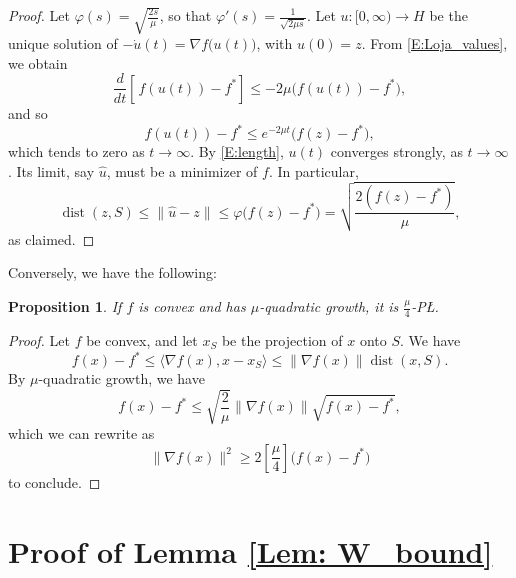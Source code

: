 \documentclass[pdflatex,sn-mathphys-num]{sn-jnl}
\theoremstyle{thmstyleone}
\newtheorem{proposition}[theorem]{Proposition}
\theoremstyle{thmstyletwo}
\theoremstyle{thmstylethree}
\DeclareMathOperator{\dist}{dist}
\begin{document}
\begin{appendices}
\begin{proof}
Let $\varphi(s)=\sqrt{\frac{2s}{\mu}}$, so that $\varphi'(s)=\frac{1}{\sqrt{2\mu s}}$. Let $u:[0,\infty)\to H$ be the unique solution of $-\dot u(t)=\nabla f\big(u(t)\big)$, with $u(0)=z$. From \eqref{E:Loja_values}, we obtain
$$\frac{d}{dt}\left[\frac{}{}\!f(u(t))-f^*\right]\le -2\mu \big(f(u(t))-f^*\big),$$
and so 
$$f(u(t))-f^*\le e^{-2\mu t}\big(f(z)-f^*\big),$$
which tends to zero as $t\to\infty$. By \eqref{E:length}, $u(t)$ converges strongly, as $t\to\infty$. Its limit, say $\hat u$, must be a minimizer of $f$. In particular,
$$\dist(z,S)\le\|\hat u-z\|\le \varphi\big( f(z)-f^*\big)=\sqrt{\frac{2(f(z)-f^*)}{\mu}},$$
as claimed.
\end{proof}

Conversely, we have the following:
\begin{proposition} \label{P:QGtoPL}
    If $f$ is convex and has $\mu$-quadratic growth, it is $\frac{\mu}{4}$-P{\L}.
\end{proposition}

\begin{proof}
Let $f$ be convex, and let $x_S$ be the projection of $x$ onto $S$. We have
$$f(x)-f^*\le\langle \nabla f(x),x-x_S\rangle\le \|\nabla f(x)\|\dist(x,S).$$
By $\mu$-quadratic growth, we have
$$f(x)-f^*\le \sqrt{\frac{2}{\mu}}\|\nabla f(x)\|\sqrt{f(x)-f^*},$$
which we can rewrite as
$$\| \nabla f(x) \|^2 \ge 2\left[\frac{\mu}{4}\right] \big( f(x) - f^* \big)$$
to conclude.
\end{proof}

\section{Proof of Lemma \ref{Lem: W_bound}} \label{A:Lemma_continuous}




\end{appendices}
\end{document}

